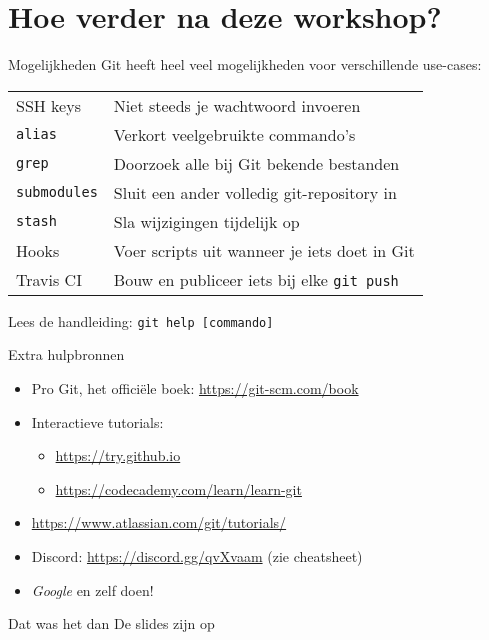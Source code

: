 \section[Hoe verder?]{Hoe verder na deze workshop?}

\begin{frame}{Mogelijkheden}
	Git heeft heel veel mogelijkheden voor verschillende use-cases:
	\begin{center}
		\begin{tabular}{ll}
			SSH keys		& Niet steeds je wachtwoord invoeren \\
			\texttt{alias} & Verkort veelgebruikte commando's \\
			\texttt{grep}	& Doorzoek alle bij Git bekende bestanden \\
			\texttt{submodules} & Sluit een ander volledig git-repository in \\
			\texttt{stash} & Sla wijzigingen tijdelijk op\\
			Hooks & Voer scripts uit wanneer je iets doet in Git \\
			Travis CI & Bouw en publiceer iets bij elke \texttt{git push}
		\end{tabular}
	\end{center}
	Lees de handleiding: \texttt{git help [commando]}
\end{frame}

\begin{frame}{Extra hulpbronnen}
	\begin{itemize}
		\item Pro Git, het offici\"ele boek: \url{https://git-scm.com/book}
		\item Interactieve tutorials:
			\begin{itemize}
				\item \url{https://try.github.io}
				\item \url{https://codecademy.com/learn/learn-git}
			\end{itemize}
		\item \url{https://www.atlassian.com/git/tutorials/}
		\item Discord: \url{https://discord.gg/qvXvaam} (zie cheatsheet)
		\item \emph{Google} en zelf doen!
	\end{itemize}
\end{frame}

\begin{frame}{Dat was het dan}
	De slides zijn op
\end{frame}
